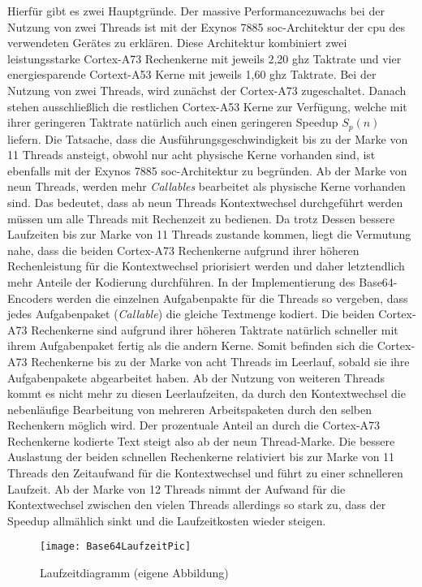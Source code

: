 Hierfür gibt es zwei Hauptgründe. Der massive Performancezuwachs bei der Nutzung von zwei Threads ist mit der Exynos 7885 \ac{soc}-Architektur der \ac{cpu} des verwendeten Gerätes zu erklären. Diese Architektur kombiniert zwei leistungsstarke Cortex-A73 Rechenkerne mit jeweils 2,20 \ac{ghz} Taktrate und vier energiesparende Cortext-A53 Kerne mit jeweils 1,60 \ac{ghz} Taktrate. Bei der Nutzung von zwei Threads, wird zunächst der Cortex-A73 zugeschaltet. Danach stehen ausschließlich die restlichen Cortex-A53 Kerne zur Verfügung, welche mit ihrer geringeren Taktrate natürlich auch einen geringeren Speedup $S_{p}(n)$ liefern. Die Tatsache, dass die Ausführungsgeschwindigkeit bis zu der Marke von 11 Threads ansteigt, obwohl nur acht physische Kerne vorhanden sind, ist ebenfalls mit der Exynos 7885 \ac{soc}-Architektur zu begründen. Ab der Marke von neun Threads, werden mehr \emph{Callables} bearbeitet als physische Kerne vorhanden sind. Das bedeutet, dass ab neun Threads Kontextwechsel durchgeführt werden müssen um alle Threads mit Rechenzeit zu bedienen. Da trotz Dessen bessere Laufzeiten bis zur Marke von 11 Threads zustande kommen, liegt die Vermutung nahe, dass die beiden Cortex-A73 Rechenkerne aufgrund ihrer höheren Rechenleistung für die Kontextwechsel priorisiert werden und daher letztendlich mehr Anteile der Kodierung durchführen. In der Implementierung des Base64-Encoders werden die einzelnen Aufgabenpakte für die Threads so vergeben, dass jedes Aufgabenpaket (\emph{Callable}) die gleiche Textmenge kodiert. Die beiden Cortex-A73 Rechenkerne sind aufgrund ihrer höheren Taktrate natürlich schneller mit ihrem Aufgabenpaket fertig als die andern Kerne. Somit befinden sich die Cortex-A73 Rechenkerne bis zu der Marke von acht Threads im Leerlauf, sobald sie ihre Aufgabenpakete abgearbeitet haben. Ab der Nutzung von weiteren Threads kommt es nicht mehr zu diesen Leerlaufzeiten, da durch den Kontextwechsel die nebenläufige Bearbeitung von mehreren Arbeitspaketen durch den selben Rechenkern möglich wird. Der prozentuale Anteil an durch die Cortex-A73 Rechenkerne kodierte Text steigt also ab der neun Thread-Marke. Die bessere Auslastung der beiden schnellen Rechenkerne relativiert bis zur Marke von 11 Threads den Zeitaufwand für die Kontextwechsel und führt zu einer schnelleren Laufzeit. Ab der Marke von 12 Threads nimmt der Aufwand für die Kontextwechsel zwischen den vielen Threads allerdings so stark zu, dass der Speedup allmählich sinkt und die Laufzeitkosten wieder steigen. 

\begin{figure}[H]
	\begin{center}	 
	\texttt{[image: Base64LaufzeitPic]}
	\caption{Laufzeitdiagramm (eigene Abbildung)}
	\label{fig:Base64LaufzeitPic} 
	\end{center}
\end{figure}


